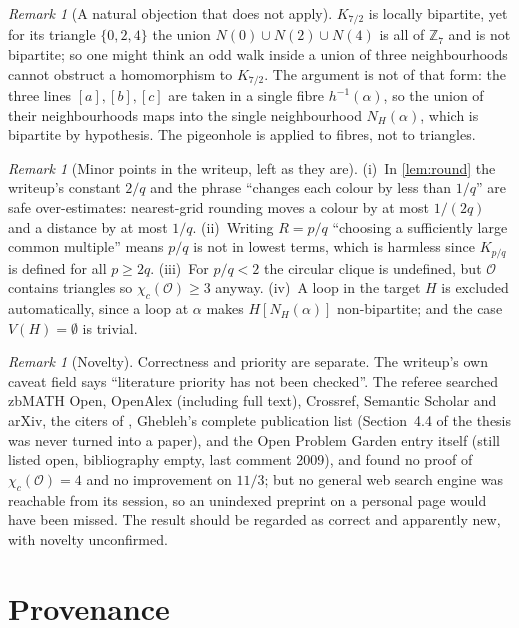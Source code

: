 \documentclass[11pt,a4paper]{article}
\theoremstyle{plain}
\theoremstyle{definition}
\theoremstyle{remark}
\newtheorem{remark}[theorem]{Remark}
\newcommand{\cO}{\mathcal O}
\newcommand{\Z}{\mathbb Z}
\newcommand{\chic}{\chi_c}
\newcommand{\Kc}[2]{K_{#1/#2}}
\begin{document}
\begin{remark}[A natural objection that does not apply]\label{rem:objection}
$\Kc72$ is locally bipartite, yet for its triangle $\{0,2,4\}$ the union $N(0)\cup N(2)\cup N(4)$ is all of $\Z_7$ and is not bipartite; so one might think an odd walk inside a union of three neighbourhoods cannot obstruct a homomorphism to $\Kc72$. The argument is not of that form: the three lines $[a],[b],[c]$ are taken in a single fibre $h^{-1}(\alpha)$, so the union of their neighbourhoods maps into the single neighbourhood $N_H(\alpha)$, which is bipartite by hypothesis. The pigeonhole is applied to fibres, not to triangles.
\end{remark}

\begin{remark}[Minor points in the writeup, left as they are]\label{rem:minor}
(i)~In \cref{lem:round} the writeup's constant $2/q$ and the phrase ``changes each colour by less than $1/q$'' are safe over-estimates: nearest-grid rounding moves a colour by at most $1/(2q)$ and a distance by at most $1/q$. (ii)~Writing $R=p/q$ ``choosing a sufficiently large common multiple'' means $p/q$ is not in lowest terms, which is harmless since $\Kc pq$ is defined for all $p\ge2q$. (iii)~For $p/q<2$ the circular clique is undefined, but $\cO$ contains triangles so $\chic(\cO)\ge3$ anyway. (iv)~A loop in the target $H$ is excluded automatically, since a loop at $\alpha$ makes $H[N_H(\alpha)]$ non-bipartite; and the case $V(H)=\emptyset$ is trivial.
\end{remark}

\begin{remark}[Novelty]\label{rem:novelty}
Correctness and priority are separate. The writeup's own caveat field says ``literature priority has not been checked''. The referee searched zbMATH Open, OpenAlex (including full text), Crossref, Semantic Scholar and arXiv, the citers of \cite{DEGGMN07}, Ghebleh's complete publication list (Section~4.4 of the thesis was never turned into a paper), and the Open Problem Garden entry itself (still listed open, bibliography empty, last comment 2009), and found no proof of $\chic(\cO)=4$ and no improvement on $11/3$; but no general web search engine was reachable from its session, so an unindexed preprint on a personal page would have been missed. The result should be regarded as correct and apparently new, with novelty unconfirmed.
\end{remark}

\section{Provenance}\label{sec:provenance}
\end{document}
